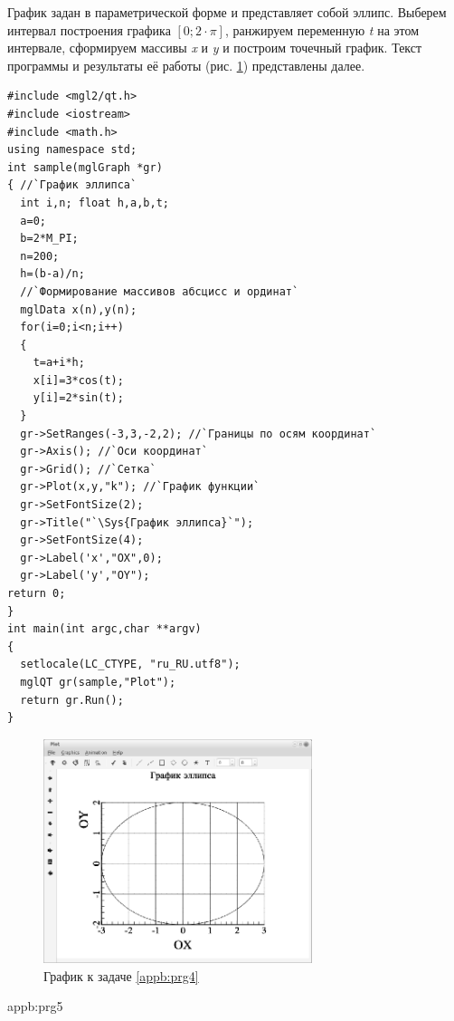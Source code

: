 
График задан в параметрической форме и представляет собой эллипс. Выберем интервал построения графика  $[0;2\cdot \pi
]$, ранжируем переменную \emph{t} на этом интервале, сформируем массивы \emph{x} и
\emph{y} и построим точечный график. Текст программы и результаты её работы (рис. \ref{appb:refDrawing5})
представлены далее.
\begin{lstlisting}
#include <mgl2/qt.h>
#include <iostream>
#include <math.h>
using namespace std;
int sample(mglGraph *gr)
{ //`График эллипса`
  int i,n; float h,a,b,t;
  a=0;
  b=2*M_PI;
  n=200;
  h=(b-a)/n;
  //`Формирование массивов абсцисс и ординат`
  mglData x(n),y(n);
  for(i=0;i<n;i++)
  {
    t=a+i*h;
    x[i]=3*cos(t);
    y[i]=2*sin(t);
  }
  gr->SetRanges(-3,3,-2,2); //`Границы по осям координат`
  gr->Axis(); //`Оси координат`
  gr->Grid(); //`Сетка`
  gr->Plot(x,y,"k"); //`График функции`
  gr->SetFontSize(2);
  gr->Title("`\Sys{График эллипса}`");
  gr->SetFontSize(4);
  gr->Label('x',"OX",0);
  gr->Label('y',"OY");
return 0;
}
int main(int argc,char **argv)
{
  setlocale(LC_CTYPE, "ru_RU.utf8");
  mglQT gr(sample,"Plot");
  return gr.Run();
}
\end{lstlisting}

\begin{figure}[htb]
\begin{center}
\includegraphics[width=0.7\textwidth]{img/ris_appb_6}
\caption{График к задаче \ref{appb:prg4}}
\label{appb:refDrawing5}
\end{center}
\end{figure}

{appb:prg5}

